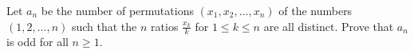 Let $a_n$ be the number of permutations $(x_1, x_2, \dots, x_n)$ of the numbers $(1,2,\dots, n)$ such that the $n$ ratios $\frac{x_k}{k}$ for $1\le k\le n$ are all distinct. Prove that $a_n$ is odd for all $n\ge 1$.